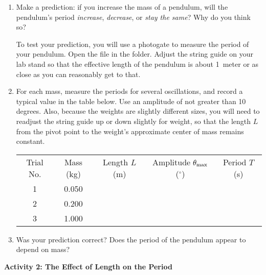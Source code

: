 \begin{enumerate}[labparts]

\item Make a prediction: if you increase the mass of a pendulum, will the pendulum's period \textit{increase}, \textit{decrease}, or \textit{stay the same}?  Why do you think so?
\answerspace{0.8in}

To test your prediction, you will use a photogate to measure the period of your pendulum.  
Open the file  in the \filename{\coursefolder} folder.  Adjust the string guide on your lab stand so that the effective length of the pendulum is about 1~meter or as close as you can reasonably get to that.  

\item For each mass, measure the periods for several oscillations, and record a typical value in the table below.  Use an amplitude of not greater than 10 degrees.  Also, because the weights are slightly different sizes, you will need to readjust the string guide up or down slightly for weight, so that the length $L$ from the pivot point to the weight's approximate center of mass remains constant.  

\begin{center}
{\renewcommand{\arraystretch}{1.8}
\begin{tabular}{|c|c|c|c|c|} \hline 
Trial No. & Mass (kg) & Length $L$ (m) & Amplitude $\theta_{\rm max}$ ($^\circ$) & Period $T$ (s) \\ 
\hhline{|=|=|=|=|=|}
1 & 0.050 & & & \\ \hline 
2 & 0.200 & & & \\ \hline 
3 & 1.000 & & & \\ \hline 
\end{tabular} }
\end{center}

\item Was your prediction correct?  Does the period of the pendulum appear to depend on mass?
\answerspace{0.8in}

\end{enumerate}

\textbf{Activity 2: The Effect of Length on the Period} 

